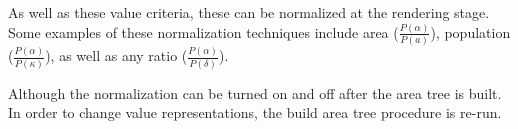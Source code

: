 As well as these value criteria, these can be normalized at the rendering stage. Some examples of these normalization techniques include area ($\frac{P(\alpha)}{P(a)}$), population ($\frac{P(\alpha)}{P(\kappa)}$), as well as any ratio ($\frac{P(\alpha)}{P(\delta)}$).

Although the normalization can be turned on and off after the area tree is built. In order to change value representations, the build area tree procedure is re-run.



%
%
%

